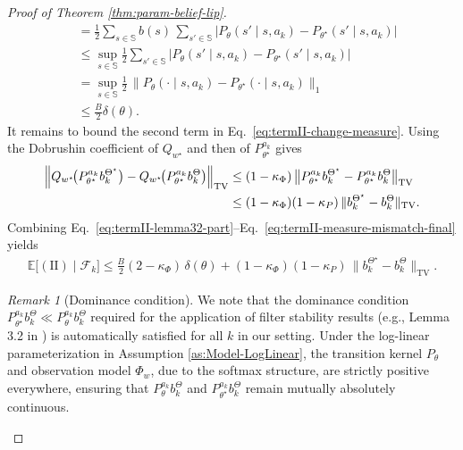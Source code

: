 \documentclass[10pt]{article} %
\theoremstyle{plain}
\theoremstyle{definition}
\theoremstyle{remark}
\newtheorem{remark}[theorem]{Remark}
\newcommand{\bE}{\mathbb{E}}
\newcommand{\bS}{\mathbb{S}}
\begin{document}
\begin{proof}[Proof of Theorem \ref{thm:param-belief-lip}]
\begin{align*}
&= \frac12 \sum_{s\in\bS} b(s)\,\sum_{s'\in\bS} \Big|P_\theta(s'\mid s,a_k)-P_{\theta^\star}(s'\mid s,a_k)\Big|\\[4pt]
&\le\sup_{s\in\bS} \frac12 \sum_{s'\in\bS} \Big|P_\theta(s'\mid s,a_k)-P_{\theta^\star}(s'\mid s,a_k)\Big| \\[4pt]
&= \sup_{s\in\bS} \frac12\, \bigl\|P_\theta(\cdot\mid s,a_k)-P_{\theta^\star}(\cdot\mid s,a_k)\bigr\|_1\\[4pt]
&\le \frac{B}{2}\delta(\theta).
\end{align*}
It remains to bound the second term in Eq.~\ref{eq:termII-change-measure}. Using the Dobrushin coefficient of \(Q_{w^\star}\) and then of \(P_{\theta^\star}^{a_k}\) gives
\begin{align}\label{eq:termII-measure-mismatch-final}
\Big\|Q_{w^\star}\!\big(P_{\theta^\star}^{a_k} b_k^{\Theta^\star}\big)-Q_{w^\star}\!\big(P_{\theta^\star}^{a_k} b_k^{\Theta}\big)\Big\|_{\mathrm{TV}}
&\le (1-\kappa_\Phi)\,\big\|P_{\theta^\star}^{a_k} b_k^{\Theta^\star}-P_{\theta^\star}^{a_k} b_k^{\Theta}\big\|_{\mathrm{TV}}\notag\\
&\le (1-\kappa_\Phi)(1-\kappa_P)\,\|b_k^{\Theta^\star}-b_k^{\Theta}\|_{\mathrm{TV}}.
\end{align}
Combining Eq.~\ref{eq:termII-lemma32-part}--Eq.~\ref{eq:termII-measure-mismatch-final} yields
\begin{align}\label{eq:termII-final-bound}
\bE\big[\mathrm{(II)}\mid \mathcal F_k\big]
\le \frac{B}{2}(2-\kappa_\Phi)\,\delta(\theta)
+(1-\kappa_\Phi)(1-\kappa_P)\,\|b_k^{\Theta^\star}-b_k^{\Theta}\|_{\mathrm{TV}}.
\end{align}

\begin{remark}[Dominance condition]
We note that the dominance condition \(P^{a_k}_{\theta^\star}b^{\Theta}_k \ll P^{a_k}_{\theta}b^\Theta_k\) required for the application of filter stability results (e.g., Lemma 3.2 in \citet{Mcdonald2024StochasticCriteria}) is automatically satisfied for all \(k\) in our setting. Under the log-linear parameterization in Assumption \ref{as:Model-LogLinear}, the transition kernel \(P_\theta\) and observation model \(\Phi_w\), due to the softmax structure, are strictly positive everywhere, ensuring that \(P^{a_k}_{\theta}b^\Theta_k\) and \(P^{a_k}_{\theta^\star}b^{\Theta}_k\) remain mutually absolutely continuous.
\end{remark}


\end{proof}
\end{document}
